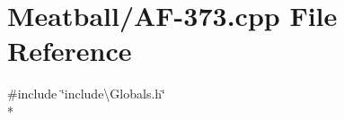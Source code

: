 \hypertarget{_a_f-373_8cpp}{\section{Meatball/\-A\-F-\/373.cpp File Reference}
\label{_a_f-373_8cpp}
}
{\ttfamily \#include \char`\"{}include\textbackslash{}\-Globals.\-h\char`\"{}}\\*
